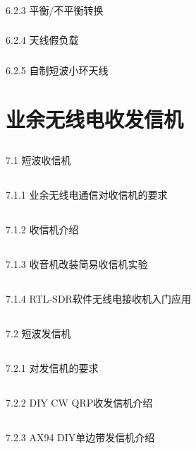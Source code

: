 \documentclass[12pt,UTF8]{ctexbook}
\begin{document}
\subsection{}6.2.3 平衡/不平衡转换
\subsection{}6.2.4 天线假负载
\subsection{}6.2.5 自制短波小环天线

\chapter{业余无线电收发信机}

\section{}7.1 短波收信机
\section{}7.1.1 业余无线电通信对收信机的要求
\section{}7.1.2 收信机介绍
\section{}7.1.3 收音机改装简易收信机实验
\section{}7.1.4 RTL-SDR软件无线电接收机入门应用
\section{}7.2 短波发信机
\section{}7.2.1 对发信机的要求
\section{}7.2.2 DIY CW QRP收发信机介绍
\section{}7.2.3 AX94 DIY单边带发信机介绍
\end{document}
